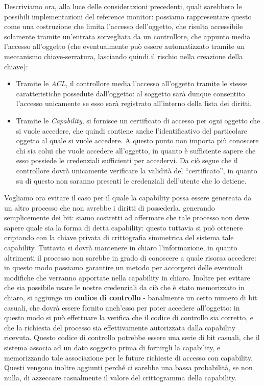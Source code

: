 Descriviamo ora, alla luce delle considerazioni precedenti, quali sarebbero le
possibili implementazioni del reference monitor: possiamo rappresentare questo
come una costruzione che limita l'accesso dell'oggetto, che risulta accessibile
solamente tramite un'entrata sorvegliata da un controllore, che appunto media 
l'accesso all'oggetto (che eventualmente può essere automatizzato tramite un
meccanismo chiave-serratura, lasciando quindi il rischio nella creazione della
chiave):
\begin{itemize}
\item Tramite le \textit{ACL}, il controllore media l'accesso all'oggetto tramite
	le stesse caratteristiche possedute dall'oggetto: al soggetto sarà 
	dunque consentito l'accesso unicamente se esso sarà registrato 
	all'interno della lista dei diritti.
\item Tramite le \textit{Capability}, si fornisce un certificato di accesso per ogni
	oggetto che si vuole accedere, che quindi contiene anche l'identificativo
	del particolare oggetto al quale si vuole accedere. A questo punto non 
	importa più conoscere chi sia colui che vuole accedere all'oggetto, in
	quanto è sufficiente sapere che esso possiede le credenziali sufficienti 
	per accedervi. Da ciò segue che il controllore dovrà unicamente 
	verificare la validità del ``certificato'', in quanto su di questo 
	non saranno presenti le credenziali dell'utente che lo detiene.
\end{itemize}

Vogliamo ora evitare il caso per il quale la capability possa essere genereata da un
altro processo che non avrebbe i diritti di possederla, generando semplicemente
dei bit: siamo costretti ad affermare che tale processo non deve sapere quale
sia la forma di detta capability: questo tuttavia si può ottenere criptando
con la chiave privata di crittografia simmetrica del sistema tale capability.
Tuttavia si dovrà
mantenere in chiaro l'informazione, in quanto altrimenti il processo non 
sarebbe in grado di conoscere a quale risorsa accedere: in questo modo possiamo
garantire un metodo per accorgerci delle eventuali modifiche che verranno
apportate nella capability in chiaro. Inoltre per evitare che sia possibile usare le nostre credenziali
da ciò che è stato memorizzato in chiaro, si aggiunge un \textbf{codice di controllo}
- banalmente un certo numero di bit casuali,
che dovrà essere fornito anch'esso per poter accedere all'oggetto: in questo
modo si può effettuare la verifica che il codice di controllo sia corretto, e 
che la richiesta del processo sia effettivamente autorizzata dalla capability 
ricevuta. Questo codice di controllo potrebbe essere una serie di bit casuali,
che il sistema associa ad un dato soggetto prima di fornirgli la capability,
e memorizzando tale associazione per le future richieste di accesso con
capability. Questi vengono inoltre aggiunti perché ci sarebbe una bassa 
probabilità, se non nulla, di azzeccare casualmente il valore del crittogramma
della capability.

